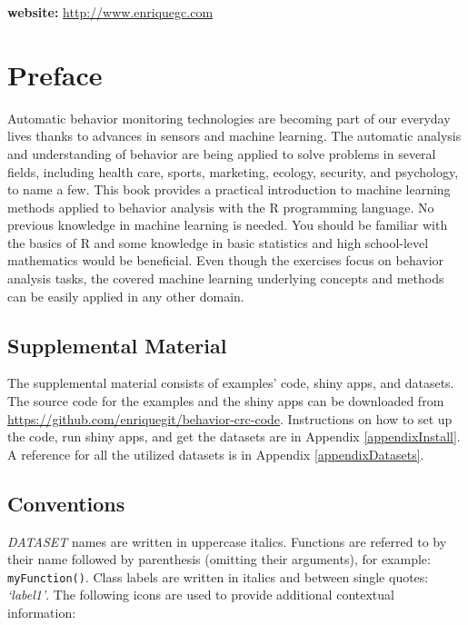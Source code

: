 \documentclass[
  11pt,
]{krantz}
\begin{document}
\textbf{website:} \url{http://www.enriquegc.com}

{}

\hypertarget{preface}{%
\chapter*{Preface}\label{preface}}


Automatic behavior monitoring technologies are becoming part of our everyday lives thanks to advances in sensors and machine learning. The automatic analysis and understanding of behavior are being applied to solve problems in several fields, including health care, sports, marketing, ecology, security, and psychology, to name a few. This book provides a practical introduction to machine learning methods applied to behavior analysis with the R programming language. No previous knowledge in machine learning is needed. You should be familiar with the basics of R and some knowledge in basic statistics and high school-level mathematics would be beneficial. Even though the exercises focus on behavior analysis tasks, the covered machine learning underlying concepts and methods can be easily applied in any other domain.

\hypertarget{supplemental-material}{%
\section*{Supplemental Material}\label{supplemental-material}}


The supplemental material consists of examples' code, shiny apps, and datasets. The source code for the examples and the shiny apps can be downloaded from \url{https://github.com/enriquegit/behavior-crc-code}. Instructions on how to set up the code, run shiny apps, and get the datasets are in Appendix \ref{appendixInstall}. A reference for all the utilized datasets is in Appendix \ref{appendixDatasets}.

\hypertarget{conventions}{%
\section*{Conventions}\label{conventions}}


\emph{DATASET} names are written in uppercase italics. Functions are referred to by their name followed by parenthesis (omitting their arguments), for example: \texttt{myFunction()}. Class labels are written in italics and between single quotes: \emph{`label1'}. The following icons are used to provide additional contextual information:
\end{document}
